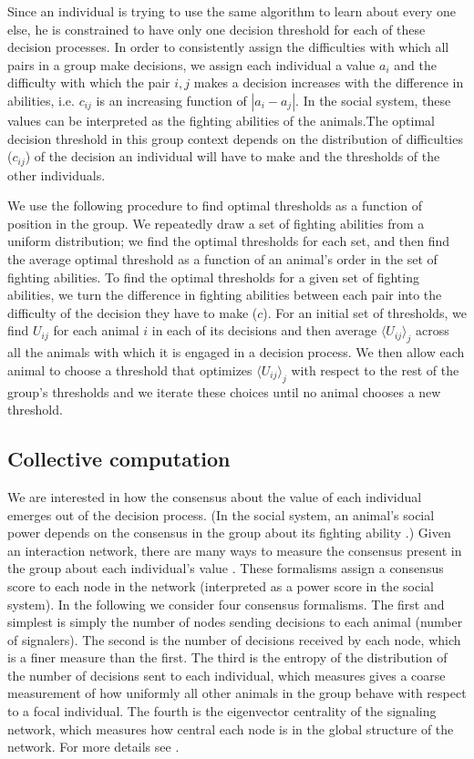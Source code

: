 \documentclass{article}
\begin{document}
Since an individual is trying to use the same algorithm to learn about every one else, he is constrained to have only one decision threshold for each of these decision processes.  In order to consistently assign the difficulties with which all pairs in a group make decisions, we assign each individual a value $a_i$ and the difficulty with which the pair $i,j$ makes a decision increases with the difference in abilities, i.e. $c_{ij}$ is an increasing function of $|a_i-a_j|$. In the social system, these values can be interpreted as the fighting abilities of the animals.The optimal decision threshold in this group context depends on the distribution of difficulties ($c_{ij}$) of the decision an individual will have to make and the thresholds of the other individuals.    

 We use the following procedure to find optimal thresholds as a function of position in the group.  We repeatedly draw a set of fighting abilities from a uniform distribution; we find the optimal thresholds for each set, and then find the average optimal threshold as a function of an animal's order in the set of fighting abilities. To find the optimal thresholds for a given set of fighting abilities, we turn the difference in fighting abilities between each pair into the difficulty of the decision they have to make ($c$).  For an initial set of thresholds, we find $U_{ij}$ for each animal $i$ in each of its decisions and then average $\langle U_{ij}\rangle_j$ across all the animals with which it is engaged in a decision process.  We then allow each animal to choose a threshold that optimizes $\langle U_{ij}\rangle_j$ with respect to the rest of the group's thresholds and we iterate these choices until no animal chooses a new threshold.  

\subsection{Collective computation }
We are interested in how the consensus about the value of each individual emerges out of the decision process.  (In the social system, an animal's social power depends on the consensus in the group about its fighting ability \cite{Brush:2013fk,Flack:2004oq,Flack:2006uq}.)  Given an interaction network, there are many ways to measure the consensus present in the group about each individual's value \cite{Brush:2013fk, Flack:2006uq}. These formalisms assign a consensus score to each node in the network (interpreted as a power score in the social system).  In the following we consider four  consensus formalisms.  The first and simplest is simply the number of nodes sending decisions to each animal (number of signalers).  The second is the number of decisions received by each node, which is a finer measure than the first.  The third is the entropy of the distribution of the number of decisions sent to each individual, which measures gives a coarse measurement of how uniformly all other animals in the group behave with respect to a focal individual.  The fourth is the eigenvector centrality of the signaling network, which measures how central each node is in the global structure of the network.  For more details see \cite{Brush:2013fk}. 
\end{document}
